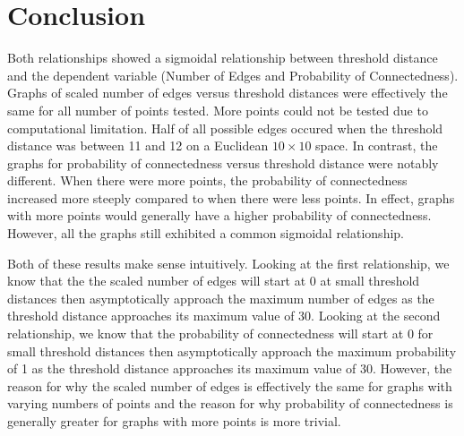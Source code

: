 \documentclass[11pt]{article}
\begin{document}
\section{Conclusion}

Both relationships showed a sigmoidal relationship between threshold distance and the dependent variable (Number of Edges and Probability of Connectedness). Graphs of scaled number of edges versus threshold distances were effectively the same for all number of points tested. More points could not be tested due to computational limitation. Half of all possible edges occured when the threshold distance was between 11 and 12 on a Euclidean $10 \times 10$ space. In contrast, the graphs for probability of connectedness versus threshold distance were notably different. When there were more points, the probability of connectedness increased more steeply compared to when there were less points. In effect, graphs with more points would generally have a higher probability of connectedness. However, all the graphs still exhibited a common sigmoidal relationship.

Both of these results make sense intuitively. Looking at the first relationship, we know that the the scaled number of edges will start at 0 at small threshold distances then asymptotically approach the maximum number of edges as the threshold distance approaches its maximum value of 30. Looking at the second relationship, we know that the probability of connectedness will start at 0 for small threshold distances then asymptotically approach the maximum probability of 1 as the threshold distance approaches its maximum value of 30. However, the reason for why the scaled number of edges is effectively the same for graphs with varying numbers of points and the reason for why probability of connectedness is generally greater for graphs with more points is more trivial.
\end{document}
